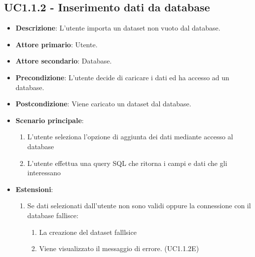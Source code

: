 \subsection{UC1.1.2 - Inserimento dati da database}
\begin{itemize}
    \item \textbf{Descrizione}: L'utente importa un dataset non vuoto dal database.

    \item \textbf{Attore primario}: Utente.
    
    \item \textbf{Attore secondario}: Database.
    
    \item \textbf{Precondizione}:   L'utente decide di caricare i dati ed ha accesso ad un database.

    \item \textbf{Postcondizione}:  Viene caricato un dataset dal database.

	\item \textbf{Scenario principale}:
		\begin{enumerate}
			\item L'utente seleziona l'opzione di aggiunta dei dati mediante accesso al database
			\item L'utente effettua una query SQL che ritorna i campi e dati che gli interessano
        \end{enumerate}

    \item \textbf{Estensioni}:
        \begin{enumerate}   
            \item Se dati selezionati dall'utente non sono validi oppure la connessione con il database fallisce:
            \begin{enumerate}
                \item La creazione del dataset falllsice
                \item Viene visualizzato il messaggio di errore. (UC1.1.2E)
            \end{enumerate}
         \end{enumerate}
\end{itemize}

